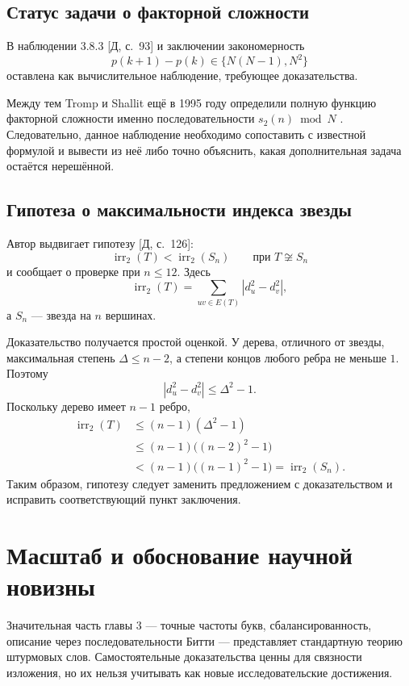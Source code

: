 \documentclass[12pt,a4paper]{article}
\newcommand{\irr}{\operatorname{irr}}
\newcommand{\sref}[1]{\textnormal{[Д, с.~#1]}}
\begin{document}
\subsection{Статус задачи о факторной сложности}

В наблюдении 3.8.3 \sref{93} и заключении закономерность
\[
  p(k+1)-p(k)\in\{N(N-1),N^2\}
\]
оставлена как вычислительное наблюдение, требующее доказательства.

Между тем Tromp и Shallit ещё в 1995 году определили полную функцию
факторной сложности именно последовательности $s_2(n)\bmod N$
\cite{tromp}. Следовательно, данное наблюдение необходимо сопоставить
с известной формулой и вывести из неё либо точно объяснить, какая
дополнительная задача остаётся нерешённой.

\subsection{Гипотеза о максимальности индекса звезды}

Автор выдвигает гипотезу \sref{126}:
\[
  \irr_2(T)<\irr_2(S_n)\qquad\text{при }T\not\cong S_n
\]
и сообщает о проверке при $n\le12$. Здесь
\[
  \irr_2(T)=\sum_{uv\in E(T)}|d_u^2-d_v^2|,
\]
а $S_n$ --- звезда на $n$ вершинах.

Доказательство получается простой оценкой. У дерева, отличного
от звезды, максимальная степень $\Delta\le n-2$, а степени концов
любого ребра не меньше $1$. Поэтому
\[
  |d_u^2-d_v^2|\le\Delta^2-1.
\]
Поскольку дерево имеет $n-1$ ребро,
\[
\begin{aligned}
  \irr_2(T)
  &\le(n-1)(\Delta^2-1)\\
  &\le(n-1)\bigl((n-2)^2-1\bigr)\\
  &<(n-1)\bigl((n-1)^2-1\bigr)
   =\irr_2(S_n).
\end{aligned}
\]
Таким образом, гипотезу следует заменить предложением
с доказательством и исправить соответствующий пункт заключения.

\section{Масштаб и обоснование научной новизны}

Значительная часть главы 3 --- точные частоты букв, сбалансированность,
описание через последовательности Битти --- представляет стандартную
теорию штурмовых слов. Самостоятельные доказательства ценны для
связности изложения, но их нельзя учитывать как новые исследовательские
достижения.
\end{document}
